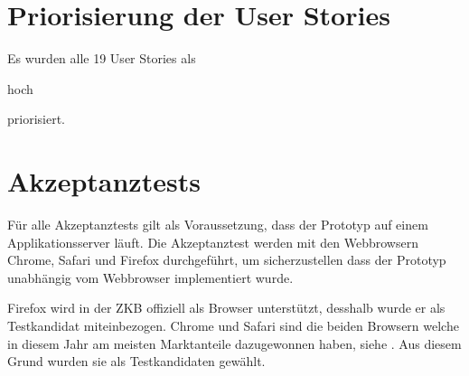 \section{Priorisierung der User Stories}

Es wurden alle 19 User Stories als \begin{itshape}hoch\end{itshape} priorisiert.

\section{Akzeptanztests}

Für alle Akzeptanztests gilt als Voraussetzung, dass der Prototyp auf einem
Applikationsserver läuft. Die Akzeptanztest werden mit den Webbrowsern Chrome,
Safari und Firefox durchgeführt, um sicherzustellen dass der Prototyp unabhängig
vom Webbrowser implementiert wurde.

Firefox wird in der \ac{ZKB} offiziell als Browser unterstützt, desshalb wurde
er als Testkandidat miteinbezogen. Chrome und Safari sind die beiden Browsern
welche in diesem Jahr am meisten Marktanteile dazugewonnen haben, siehe
\cite{BrowserStatistik}. Aus diesem Grund wurden sie als Testkandidaten gewählt.

